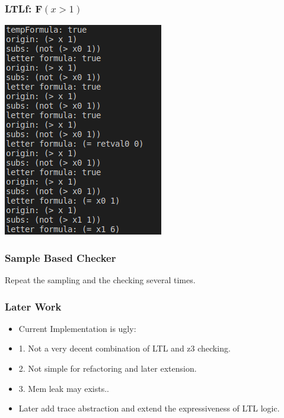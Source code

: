 \documentclass[11pt]{beamer}
\begin{document}
\begin{frame}\frametitle{LTLf: $\mathbf{F}(x > 1)$}

\begin{center}
\includegraphics[scale=0.6]{fx>1.png}
\end{center}

\end{frame}

\begin{frame}\frametitle{Sample Based Checker}

Repeat the sampling and the checking several times.

\end{frame}

\begin{frame}\frametitle{Later Work}
\begin{itemize}
\item Current Implementation is ugly:
\item 1. Not a very decent combination of LTL and z3 checking.
\item 2. Not simple for refactoring and later extension.
\item 3. Mem leak may exists..
\item Later add trace abstraction and extend the expressiveness of LTL logic.
\end{itemize}

\end{frame}
\end{document}
